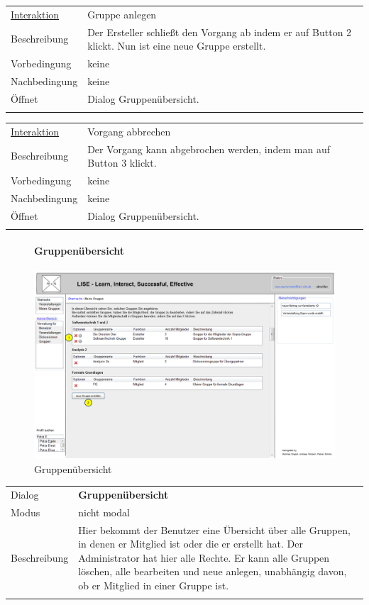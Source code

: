 \documentclass[12pt,a4paper]{article}
\begin{document}
{\begin{tabular}{l p{12cm}}
	\underline{Interaktion} 	 & Gruppe anlegen\\ 
	Beschreibung   	& Der Ersteller schließt den Vorgang ab indem er auf Button 2 klickt. Nun ist eine neue Gruppe erstellt.\\
	Vorbedingung	& keine \\
	Nachbedingung	& keine \\
	Öffnet			& Dialog \glqq Gruppenübersicht\grqq.\\\\
\end{tabular}

\begin{tabular}{l p{12cm}}
	\underline{Interaktion} 	 & Vorgang abbrechen\\ 
	Beschreibung   	& Der Vorgang kann abgebrochen werden, indem man auf Button 3 klickt.\\
	Vorbedingung	& keine \\
	Nachbedingung	& keine \\
	Öffnet			& Dialog \glqq Gruppenübersicht\grqq.\\\\
\end{tabular}

\begin{figure}[H]
	\centering
	\paragraph{Gruppenübersicht}
	\includegraphics[width=\textwidth]{Bilder/Mockups/GUI/Gruppenuebersicht.png}
	\caption{Gruppenübersicht}
	\label{GuiGruppenuebersicht}
\end{figure}
\begin{tabular}{l p{12cm}}
	Dialog 	 & \textbf{Gruppenübersicht} \\ 
	Modus & nicht modal\\ 
	Beschreibung   	& Hier bekommt der Benutzer eine Übersicht über alle Gruppen, in denen er Mitglied ist oder die er erstellt hat. Der Administrator hat hier alle Rechte. Er kann alle Gruppen löschen, alle bearbeiten und neue anlegen, unabhängig davon, ob er Mitglied in einer Gruppe ist.\\\\
	

\end{tabular}}
\end{document}
